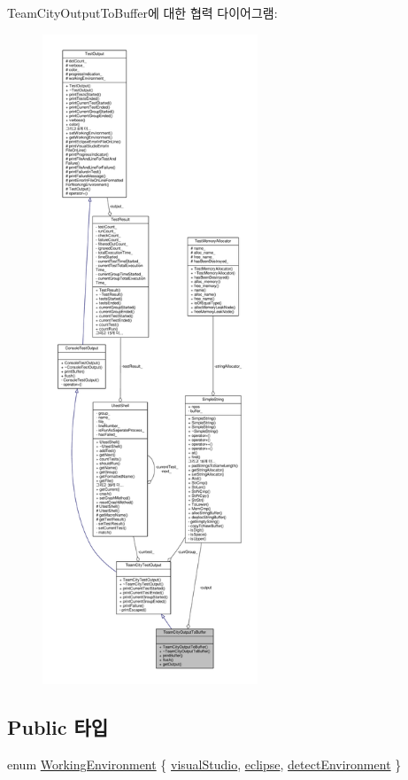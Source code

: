 Team\+City\+Output\+To\+Buffer에 대한 협력 다이어그램\+:
\nopagebreak
\begin{figure}[H]
\begin{center}
\leavevmode
\includegraphics[height=550pt]{class_team_city_output_to_buffer__coll__graph}
\end{center}
\end{figure}
\subsection*{Public 타입}
\begin{DoxyCompactItemize}
\item 
enum \hyperlink{class_test_output_a0541851f863713454486a9fb3080f766}{Working\+Environment} \{ \hyperlink{class_test_output_a0541851f863713454486a9fb3080f766a47f3a5b9ed4237588024b983a4ca8399}{visual\+Studio}, 
\hyperlink{class_test_output_a0541851f863713454486a9fb3080f766abf6505364f680c2682d5648cd0c76f53}{eclipse}, 
\hyperlink{class_test_output_a0541851f863713454486a9fb3080f766a3f11f791db94db142e33c3c75442ed10}{detect\+Environment}
 \}
\end{DoxyCompactItemize}
